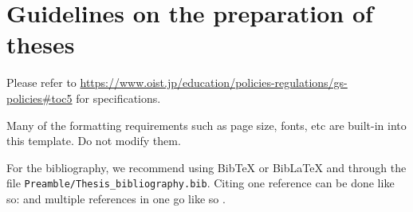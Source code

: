 
\chapter{Guidelines on the preparation of theses} \label{ch-1}

Please refer to \url{https://www.oist.jp/education/policies-regulations/gs-policies#toc5} for specifications.

Many of the formatting requirements such as page size, fonts, etc are built-in into this template. Do not modify them.

For the bibliography, we recommend using BibTeX or BibLaTeX and through the file \texttt{Preamble/Thesis\_bibliography.bib}. Citing one reference can be done like so: \cite{Lee98} and multiple references in one go like so \cite{Fil09, Muc10, Kra27}.
